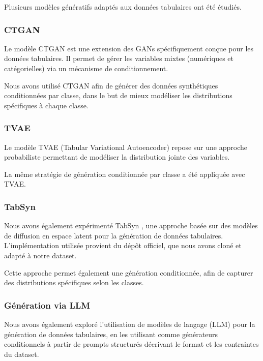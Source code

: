 \documentclass[conference]{IEEEtran}
\begin{document}
Plusieurs modèles génératifs adaptés aux données tabulaires ont été étudiés.\\

\subsubsection{\textbf{CTGAN}}

Le modèle CTGAN \cite{xu2019modeling} est une extension des GANs spécifiquement conçue pour les données tabulaires. Il permet de gérer les variables mixtes (numériques et catégorielles) via un mécanisme de conditionnement.

Nous avons utilisé CTGAN afin de générer des données synthétiques conditionnées par classe, dans le but de mieux modéliser les distributions spécifiques à chaque classe.\\

\subsubsection{\textbf{TVAE}}

Le modèle TVAE (Tabular Variational Autoencoder) \cite{xu2019modeling} repose sur une approche probabiliste permettant de modéliser la distribution jointe des variables.

La même stratégie de génération conditionnée par classe a été appliquée avec TVAE.\\

\subsubsection{\textbf{TabSyn}}

Nous avons également expérimenté TabSyn \cite{zhang2024tabsyn}, une approche basée sur des modèles de diffusion en espace latent pour la génération de données tabulaires. L’implémentation utilisée provient du dépôt officiel, que nous avons cloné et adapté à notre dataset.

Cette approche permet également une génération conditionnée, afin de capturer des distributions spécifiques selon les classes.\\

\subsubsection{\textbf{Génération via LLM}}

Nous avons également exploré l’utilisation de modèles de langage (LLM) pour la génération de données tabulaires, en les utilisant comme générateurs conditionnels à partir de prompts structurés décrivant le format et les contraintes du dataset.
\end{document}
